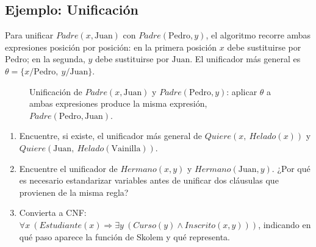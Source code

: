 \subsection{Ejemplo: Unificación}

\begin{example}
    Para unificar $Padre(x,\text{Juan})$ con $Padre(\text{Pedro},y)$, el algoritmo recorre ambas expresiones posición
    por posición: en la primera posición $x$ debe sustituirse por $\text{Pedro}$; en la segunda, $y$ debe sustituirse
    por $\text{Juan}$. El unificador más general es $\theta = \{x/\text{Pedro},\ y/\text{Juan}\}$.
\end{example}

\begin{figure}[H]
\centering
{}
\caption{Unificación de $Padre(x,\text{Juan})$ y $Padre(\text{Pedro},y)$: aplicar $\theta$ a ambas expresiones produce
la misma expresión, $Padre(\text{Pedro},\text{Juan})$.}
\end{figure}

\begin{exercise}
    \begin{enumerate}
        \item Encuentre, si existe, el unificador más general de $Quiere(x,\ Helado(x))$ y
        $Quiere(\text{Juan},\ Helado(\text{Vainilla}))$.
        \item Encuentre el unificador de $Hermano(x,y)$ y $Hermano(\text{Juan},y)$. ¿Por qué es necesario
        estandarizar variables antes de unificar dos cláusulas que provienen de la misma regla?
        \item Convierta a CNF: $\forall x\ (Estudiante(x) \Rightarrow \exists y\ (Curso(y) \land Inscrito(x,y)))$,
        indicando en qué paso aparece la función de Skolem y qué representa.
    \end{enumerate}
\end{exercise}
